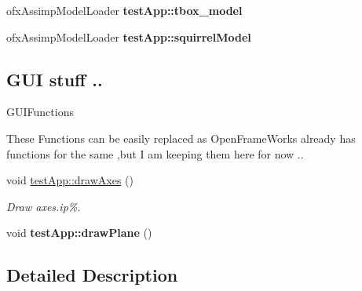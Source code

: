 \begin{DoxyCompactItemize}
\item 
\hypertarget{group___int_variables_ga56819e740669b8f1b443bdee23851442}{ofx\-Assimp\-Model\-Loader {\bfseries test\-App\-::tbox\-\_\-model}}\label{group___int_variables_ga56819e740669b8f1b443bdee23851442}

\item 
\hypertarget{group___int_variables_ga6319a81becbadfcdd229bf2c98a7f930}{ofx\-Assimp\-Model\-Loader {\bfseries test\-App\-::squirrel\-Model}}\label{group___int_variables_ga6319a81becbadfcdd229bf2c98a7f930}

\end{DoxyCompactItemize}
\subsection*{G\-U\-I stuff ..}
\label{_amgrpdec04b6562afd1eb3cc9849599930a1a}%
G\-U\-I\-Functions

These Functions can be easily replaced as Open\-Frame\-Works already has functions for the same ,but I am keeping them here for now .. \begin{DoxyCompactItemize}
\item 
void \hyperlink{group___int_variables_gaa2fcbae31171ba366d4c0fcaf44149f4}{test\-App\-::draw\-Axes} ()
\begin{DoxyCompactList}\small\item\em Draw axes.ip\%. \end{DoxyCompactList}\item 
\hypertarget{group___int_variables_ga47747729f6d0d84c36ef0ec9fca01303}{void {\bfseries test\-App\-::draw\-Plane} ()}\label{group___int_variables_ga47747729f6d0d84c36ef0ec9fca01303}

\end{DoxyCompactItemize}


\subsection{Detailed Description}


